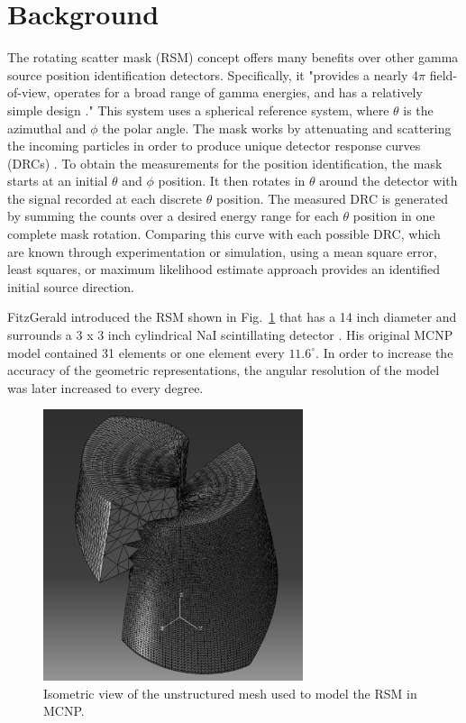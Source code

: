 \documentclass[3p,times]{elsarticle}
\begin{document}
\section{Background}
The rotating scatter mask (RSM) concept offers many benefits over other gamma source position identification detectors.  
Specifically, it "provides a nearly 4$\pi$ field-of-view, operates for a broad range of gamma energies, and has a relatively simple design \cite{Logan2017}." 
This system uses a spherical reference system, where $\theta$ is the azimuthal and $\phi$ the polar angle.  
The mask works by attenuating and scattering the incoming particles in order to produce unique detector response curves (DRCs) \cite{Logan2017}.  
To obtain the measurements for the position identification, the mask starts at an initial $\theta$ and $\phi$ position.
It then rotates in $\theta$ around the detector with the signal recorded at each discrete $\theta$ position.  
The measured DRC is generated by summing the counts over a desired energy range for each $\theta$ position in one complete mask rotation.  
Comparing this curve with each possible DRC, which are known through experimentation or simulation, using a mean square error, least squares, or maximum likelihood estimate approach provides an identified initial source direction.

FitzGerald introduced the RSM shown in Fig.~\ref{fig:RSM} that has a 14 inch diameter and surrounds a 3 x 3 inch cylindrical NaI scintillating detector \cite{FitzGerald2015}. 
His original MCNP model contained 31 elements or one element every $11.6^\circ$.  
In order to increase the accuracy of the geometric representations,  the angular resolution of the model was later increased to every degree.  

\begin{figure}[ht!]
\includegraphics[width={3.0in}]{../figs/P2AtIso.pdf}
\centering
\caption{Isometric view of the unstructured mesh used to model the RSM in MCNP.}
\label{fig:RSM}
\end{figure}
\end{document}
